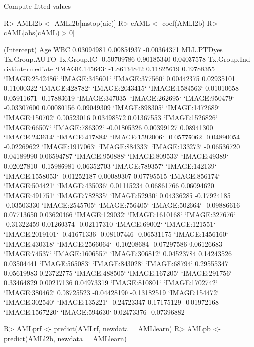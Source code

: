 \documentclass{article}
\newenvironment{Schunk}{}{}
\begin{document}
Compute fitted values
\begin{Schunk}
\begin{Sinput}
R> AMLl2b <- AMLl2b[mstop(aic)]
R> cAML <- coef(AMLl2b)
R> cAML[abs(cAML) > 0]
\end{Sinput}
\begin{Soutput}
     (Intercept)              Age              WBC 
      0.03094981       0.00854937      -0.00364371 
      MLL.PTDyes    Tx.Group.AUTO      Tx.Group.IC 
     -0.50709786       0.90185340       0.04037578 
    Tx.Group.Ind riskintermediate   `IMAGE:145643` 
     -1.86134842       0.11825619       0.19788355 
 `IMAGE:2542486`   `IMAGE:345601`   `IMAGE:377560` 
      0.00442375       0.02935101       0.11000322 
  `IMAGE:428782`  `IMAGE:2043415`  `IMAGE:1584563` 
      0.01010658       0.05911671      -0.17883619 
  `IMAGE:347035`   `IMAGE:262695`   `IMAGE:950479` 
     -0.03307600       0.00080156       0.09049309 
  `IMAGE:898305`  `IMAGE:1472689`   `IMAGE:150702` 
      0.00523016       0.03498572       0.01367553 
 `IMAGE:1526826`    `IMAGE:66507`   `IMAGE:786302` 
     -0.01805326       0.00399127       0.08941300 
  `IMAGE:243614`   `IMAGE:417884`  `IMAGE:1592006` 
     -0.05776062      -0.04890054      -0.02269622 
 `IMAGE:1917063`   `IMAGE:884333`   `IMAGE:133273` 
     -0.06536720       0.04189990       0.06594787 
  `IMAGE:950888`   `IMAGE:809533`    `IMAGE:49389` 
      0.02027810      -0.15986981       0.06352703 
  `IMAGE:789357`   `IMAGE:142139`  `IMAGE:1558053` 
     -0.01252187       0.00089307       0.07795515 
  `IMAGE:856174`   `IMAGE:504421`   `IMAGE:435036` 
      0.01115234       0.06861766       0.06094620 
  `IMAGE:491751`   `IMAGE:782835`    `IMAGE:52930` 
      0.04336285      -0.17924185      -0.03503330 
 `IMAGE:2545705`   `IMAGE:756405`   `IMAGE:502664` 
     -0.09886616       0.07713650       0.03620466 
  `IMAGE:129032`  `IMAGE:1610168`   `IMAGE:327676` 
     -0.31322459       0.01260374      -0.02117310 
   `IMAGE:69002`   `IMAGE:121551`  `IMAGE:2019101` 
     -0.41671336      -0.08107446      -0.06531175 
 `IMAGE:1456160`   `IMAGE:430318`  `IMAGE:2566064` 
     -0.10208684      -0.07297586       0.06126683 
   `IMAGE:74537`  `IMAGE:1606557`   `IMAGE:306812` 
      0.04523784       0.14243526       0.03504441 
  `IMAGE:565083`   `IMAGE:843028`    `IMAGE:68794` 
      0.29555347       0.05619983       0.23722775 
  `IMAGE:488505`   `IMAGE:167205`   `IMAGE:291756` 
      0.33464829       0.00217136       0.04973319 
  `IMAGE:810801`  `IMAGE:1702742`   `IMAGE:380462` 
      0.08725523      -0.04428190      -0.13182519 
  `IMAGE:154472`   `IMAGE:302540`   `IMAGE:135221` 
     -0.24723347       0.17175129      -0.01972168 
 `IMAGE:1567220`   `IMAGE:594630` 
      0.02473376      -0.07396882 
\end{Soutput}
\begin{Sinput}
R> AMLprf <- predict(AMLrf, newdata = AMLlearn)
R> AMLpb <- predict(AMLl2b, newdata = AMLlearn)
\end{Sinput}
\end{Schunk}
\end{document}
